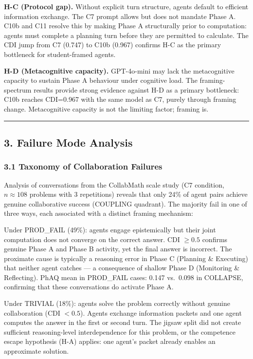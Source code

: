 \documentclass[
  11pt,
]{article}
\begin{document}
\textbf{H-C (Protocol gap).} Without explicit turn structure, agents default to efficient information exchange. The C7 prompt allows but does not mandate Phase A. C10b and C11 resolve this by making Phase A structurally prior to computation: agents must complete a planning turn before they are permitted to calculate. The CDI jump from C7 (0.747) to C10b (0.967) confirms H-C as the primary bottleneck for student-framed agents.

\textbf{H-D (Metacognitive capacity).} GPT-4o-mini may lack the metacognitive capacity to sustain Phase A behaviour under cognitive load. The framing-spectrum results provide strong evidence against H-D as a primary bottleneck: C10b reaches CDI=0.967 with the same model as C7, purely through framing change. Metacognitive capacity is not the limiting factor; framing is.

\begin{center}\rule{0.5\linewidth}{0.5pt}\end{center}

\subsection{3. Failure Mode Analysis}\label{failure-mode-analysis}

\subsubsection{3.1 Taxonomy of Collaboration
Failures}\label{taxonomy-of-collaboration-failures}

Analysis of conversations from the CollabMath scale study (C7 condition, $n \approx 108$ problems with 3 repetitions) reveals that only 24\% of agent pairs achieve genuine collaborative success (COUPLING quadrant). The majority fail in one of three ways, each associated with a distinct framing mechanism:

Under PROD\_FAIL (49\%): agents engage epistemically but their joint computation does not converge on the correct answer. CDI $\geq 0.5$ confirms genuine Phase A and Phase B activity, yet the final answer is incorrect. The proximate cause is typically a reasoning error in Phase C (Planning \& Executing) that neither agent catches --- a consequence of shallow Phase D (Monitoring \& Reflecting). PhAQ mean in PROD\_FAIL cases: 0.147 vs.\ 0.098 in COLLAPSE, confirming that these conversations do activate Phase A.

Under TRIVIAL (18\%): agents solve the problem correctly without genuine collaboration (CDI $< 0.5$). Agents exchange information packets and one agent computes the answer in the first or second turn. The jigsaw split did not create sufficient reasoning-level interdependence for this problem, or the competence escape hypothesis (H-A) applies: one agent's packet already enables an approximate solution.
\end{document}
